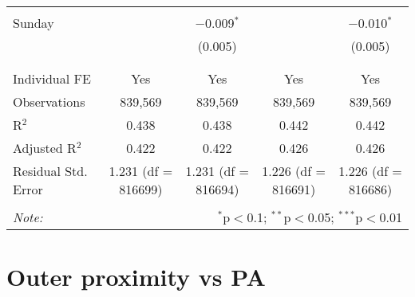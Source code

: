 \documentclass[
]{article}
\begin{document}
\begin{table}[!htbp]
{\begin{tabular}{@{\extracolsep{5pt}}lcccc}
  & & & & \\ 
 Sunday &  & $-$0.009$^{*}$ &  & $-$0.010$^{*}$ \\ 
  &  & (0.005) &  & (0.005) \\ 
  & & & & \\ 
\hline \\[-1.8ex] 
Individual FE & Yes & Yes & Yes & Yes \\ 
Observations & 839,569 & 839,569 & 839,569 & 839,569 \\ 
R$^{2}$ & 0.438 & 0.438 & 0.442 & 0.442 \\ 
Adjusted R$^{2}$ & 0.422 & 0.422 & 0.426 & 0.426 \\ 
Residual Std. Error & 1.231 (df = 816699) & 1.231 (df = 816694) & 1.226 (df = 816691) & 1.226 (df = 816686) \\ 
\hline 
\hline \\[-1.8ex] 
\textit{Note:}  & \multicolumn{4}{r}{$^{*}$p$<$0.1; $^{**}$p$<$0.05; $^{***}$p$<$0.01} \\ 
\end{tabular}
} 
\end{table} 
\newpage
\section{Outer proximity vs PA}
\end{document}
